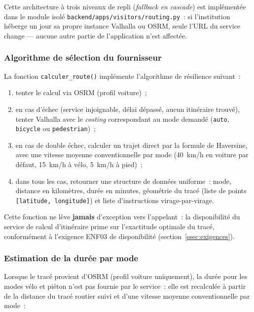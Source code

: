 \documentclass[12pt, a4paper]{report}
\begin{document}
Cette architecture à trois niveaux de repli (\textit{fallback en cascade})
est implémentée dans le module isolé \texttt{backend/apps/visitors/routing.py}~:
si l'institution héberge un jour sa propre instance Valhalla ou OSRM, seule
l'URL du service change --- aucune autre partie de l'application n'est
affectée.

\subsubsection{Algorithme de sélection du fournisseur}

La fonction \texttt{calculer\_route()} implémente l'algorithme de
résilience suivant~:

\begin{enumerate}[itemsep=2pt, topsep=4pt, leftmargin=1.5cm]
  \item tenter le calcul via OSRM (profil voiture)~;
  \item en cas d'échec (service injoignable, délai dépassé, aucun itinéraire
    trouvé), tenter Valhalla avec le \textit{costing} correspondant au mode
    demandé (\texttt{auto}, \texttt{bicycle} ou \texttt{pedestrian})~;
  \item en cas de double échec, calculer un trajet direct par la formule de
    Haversine, avec une vitesse moyenne conventionnelle par mode
    (40~km/h en voiture par défaut, 15~km/h à vélo, 5~km/h à pied)~;
  \item dans tous les cas, retourner une structure de données uniforme~:
    mode, distance en kilomètres, durée en minutes, géométrie du tracé
    (liste de points \texttt{[latitude, longitude]}) et liste d'instructions
    virage-par-virage.
\end{enumerate}

Cette fonction ne lève \textbf{jamais} d'exception vers l'appelant~: la
disponibilité du service de calcul d'itinéraire prime sur l'exactitude
optimale du tracé, conformément à l'exigence ENF03 de disponibilité
(section~\ref{ssec:exigences}).

\subsubsection{Estimation de la durée par mode}

Lorsque le tracé provient d'OSRM (profil voiture uniquement), la durée pour
les modes vélo et piéton n'est pas fournie par le service~: elle est
recalculée à partir de la distance du tracé routier suivi et d'une vitesse
moyenne conventionnelle par mode~:
\end{document}
